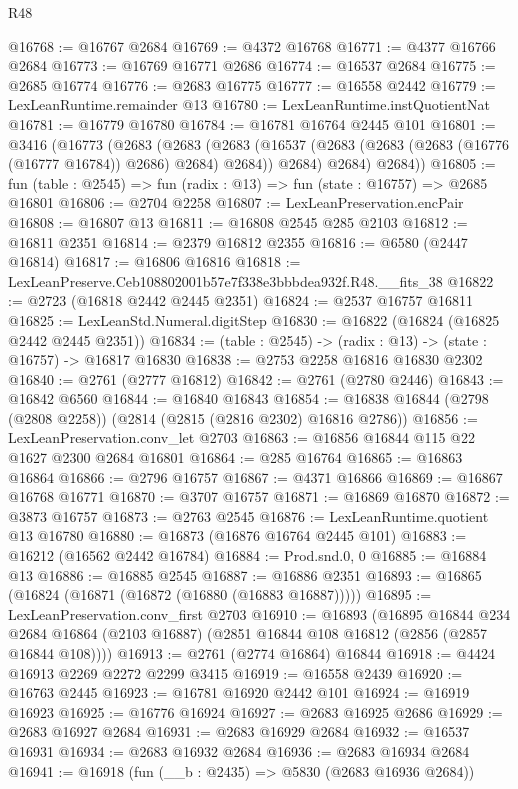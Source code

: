 \begin{lexlean}{R48}
\begin{coremodule}
@16768 := @16767 @2684
@16769 := @4372 @16768
@16771 := @4377 @16766 @2684
@16773 := @16769 @16771 @2686
@16774 := @16537 @2684
@16775 := @2685 @16774
@16776 := @2683 @16775
@16777 := @16558 @2442
@16779 := LexLeanRuntime.remainder @13
@16780 := LexLeanRuntime.instQuotientNat
@16781 := @16779 @16780
@16784 := @16781 @16764 @2445 @101
@16801 := @3416
    (@16773
      (@2683
        (@2683
          (@2683 (@16537 (@2683 (@2683 (@2683 (@16776 (@16777 @16784)) @2686) @2684) @2684)) @2684)
          @2684)
        @2684))
@16805 := fun (table : @2545) => fun (radix : @13) => fun (state : @16757) => @2685 @16801
@16806 := @2704 @2258
@16807 := LexLeanPreservation.encPair
@16808 := @16807 @13
@16811 := @16808 @2545 @285 @2103
@16812 := @16811 @2351
@16814 := @2379 @16812 @2355
@16816 := @6580 (@2447 @16814)
@16817 := @16806 @16816
@16818 := LexLeanPreserve.Ceb108802001b57e7f338e3bbbdea932f.R48.__fits_38
@16822 := @2723 (@16818 @2442 @2445 @2351)
@16824 := @2537 @16757 @16811
@16825 := LexLeanStd.Numeral.digitStep
@16830 := @16822 (@16824 (@16825 @2442 @2445 @2351))
@16834 := (table : @2545) -> (radix : @13) -> (state : @16757) -> @16817 @16830
@16838 := @2753 @2258 @16816 @16830 @2302
@16840 := @2761 (@2777 @16812)
@16842 := @2761 (@2780 @2446)
@16843 := @16842 @6560
@16844 := @16840 @16843
@16854 := @16838 @16844 (@2798 (@2808 @2258)) (@2814 (@2815 (@2816 @2302) @16816 @2786))
@16856 := LexLeanPreservation.conv_let @2703
@16863 := @16856 @16844 @115 @22 @1627 @2300 @2684 @16801
@16864 := @285 @16764
@16865 := @16863 @16864
@16866 := @2796 @16757
@16867 := @4371 @16866
@16869 := @16867 @16768 @16771
@16870 := @3707 @16757
@16871 := @16869 @16870
@16872 := @3873 @16757
@16873 := @2763 @2545
@16876 := LexLeanRuntime.quotient @13 @16780
@16880 := @16873 (@16876 @16764 @2445 @101)
@16883 := @16212 (@16562 @2442 @16784)
@16884 := Prod.snd.{0, 0}
@16885 := @16884 @13
@16886 := @16885 @2545
@16887 := @16886 @2351
@16893 := @16865 (@16824 (@16871 (@16872 (@16880 (@16883 @16887)))))
@16895 := LexLeanPreservation.conv_first @2703
@16910 := @16893
    (@16895
      @16844
      @234
      @2684
      @16864
      (@2103 @16887)
      (@2851 @16844 @108 @16812 (@2856 (@2857 @16844 @108))))
@16913 := @2761 (@2774 @16864) @16844
@16918 := @4424 @16913 @2269 @2272 @2299 @3415
@16919 := @16558 @2439
@16920 := @16763 @2445
@16923 := @16781 @16920 @2442 @101
@16924 := @16919 @16923
@16925 := @16776 @16924
@16927 := @2683 @16925 @2686
@16929 := @2683 @16927 @2684
@16931 := @2683 @16929 @2684
@16932 := @16537 @16931
@16934 := @2683 @16932 @2684
@16936 := @2683 @16934 @2684
@16941 := @16918 (fun (__b : @2435) => @5830 (@2683 @16936 @2684))

\end{coremodule}
\end{lexlean}
